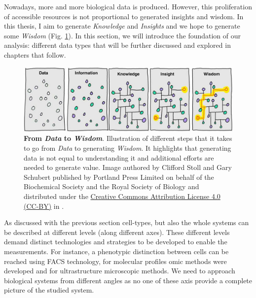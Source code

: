 \documentclass[12pt,]{book}
\theoremstyle{definition}
\theoremstyle{definition}
\theoremstyle{definition}
\theoremstyle{remark}
\begin{document}
Nowadays, more and more biological data is produced. However, this
proliferation of accessible resources is not proportional to generated
insights and wisdom. In this thesis, I aim to generate \emph{Knowledge}
and \emph{Insights} and we hope to generate some \emph{Wisdom} (Fig.
\ref{fig:information-power}). In this section, we will introduce the
foundation of our analysis: different data types that will be further
discussed and explored in chapters that follow.

\begin{figure}

{\centering \includegraphics[width=0.8\linewidth]{figures-ext/01-Information_power} 

}

\caption[From Data to Wisdom]{\textbf{From \emph{Data} to
\emph{Wisdom}}. Illustration of different steps that it takes to go from
\emph{Data} to generating \emph{Wisdom}. It highlights that generating
data is not equal to understanding it and additional efforts are needed
to generate value. Image authored by Clifford Stoll and Gary Schubert
published by Portland Press Limited on behalf of the Biochemical Society
and the Royal Society of Biology and distributed under the
\href{https://creativecommons.org/licenses/by/4.0/}{Creative Commons
Attribution License 4.0 (CC-BY)} in \citep{Ponting2017}.}\label{fig:information-power}
\end{figure}











As discussed with the previous section cell-types, but also the whole
systems can be described at different levels (along different axes).
These different levels demand distinct technologies and strategies to be
developed to enable the measurements. For instance, a phenotypic
distinction between cells can be reached using FACS technology, for
molecular profiles omic methods were developed and for ultrastructure
microscopic methods. We need to approach biological systems from
different angles as no one of these axis provide a complete picture of
the studied system.
\end{document}
